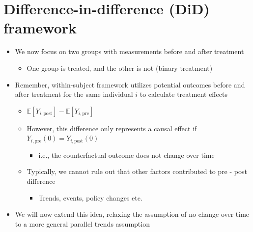 \documentclass[10pt]{article}
\begin{document}
\section{Difference-in-difference (DiD) framework}
\begin{itemize}
    \item We now focus on two groups with measurements before and after treatment 
    \begin{itemize}
        \item One group is treated, and the other is not (binary treatment)
    \end{itemize}
    \item Remember, within-subject framework utilizes potential outcomes before and after treatment for the same individual $i $ to calculate treatment effects 
    \begin{itemize}
        \item $\mathbb{E}[Y_{i, \text{post}}] - \mathbb{E}[Y_{i, \text{pre}}]$
        \item However, this difference only represents a causal effect if $Y_{i, \text{pre}}(0) = Y_{i, \text{post}}(0) $
        \begin{itemize}
            \item i.e., the counterfactual outcome does not change over time 
        \end{itemize}
        \item Typically, we cannot rule out that other factors contributed to pre - post difference
        \begin{itemize}
            \item Trends, events, policy changes etc. 
        \end{itemize}
    \end{itemize}
    \item We will now extend this idea, relaxing the assumption of no change over time to a more general parallel trends assumption 
\end{itemize}
\newpage
\end{document}
